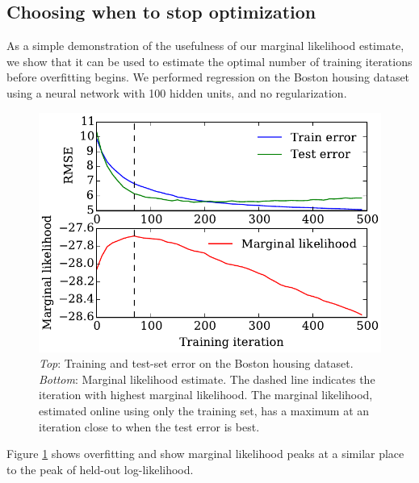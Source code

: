 \documentclass[]{article}
\begin{document}
\subsection{Choosing when to stop optimization}

As a simple demonstration of the usefulness of our marginal likelihood estimate, we show that it can be used to estimate the optimal number of training iterations before overfitting begins.
We performed regression on the Boston housing dataset 
using a neural network with 100 hidden units, and no regularization.

\begin{figure}[h!]
\begin{center}
\includegraphics[width=\columnwidth]{../experiments/2015_03_01_housing/2/marglik}
\vskip -0.1in
\caption{\emph{Top}: Training and test-set error on the Boston housing dataset.
\emph{Bottom}: Marginal likelihood estimate.
The dashed line indicates the iteration with highest marginal likelihood.
The marginal likelihood, estimated online using only the training set, has a maximum at an iteration close to when the test error is best.}
\label{fig:housing}
\end{center}
\end{figure}


Figure \ref{fig:housing} shows overfitting and show marginal likelihood peaks at a similar place to the peak of held-out log-likelihood.
\end{document}
